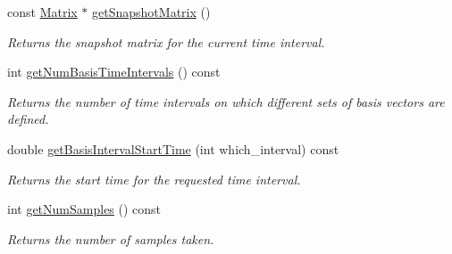 \begin{DoxyCompactItemize}
const \hyperlink{class_c_a_r_o_m_1_1_matrix}{Matrix} $\ast$ \hyperlink{class_c_a_r_o_m_1_1_basis_generator_a11d6944c39a92f3707a41a07c7411825}{get\-Snapshot\-Matrix} ()
\begin{DoxyCompactList}\small\item\em Returns the snapshot matrix for the current time interval. \end{DoxyCompactList}\item 
int \hyperlink{class_c_a_r_o_m_1_1_basis_generator_a691dbd10eac5510f9e361d15e2bc1e26}{get\-Num\-Basis\-Time\-Intervals} () const 
\begin{DoxyCompactList}\small\item\em Returns the number of time intervals on which different sets of basis vectors are defined. \end{DoxyCompactList}\item 
double \hyperlink{class_c_a_r_o_m_1_1_basis_generator_a416a07725bb0a2dea258fb2f090256e9}{get\-Basis\-Interval\-Start\-Time} (int which\-\_\-interval) const 
\begin{DoxyCompactList}\small\item\em Returns the start time for the requested time interval. \end{DoxyCompactList}\item 
int \hyperlink{class_c_a_r_o_m_1_1_basis_generator_a1b8f46066493239cda68f40af92a6a23}{get\-Num\-Samples} () const 
\begin{DoxyCompactList}\small\item\em Returns the number of samples taken. \end{DoxyCompactList}\end{DoxyCompactItemize}

